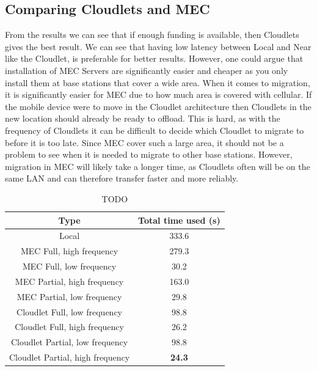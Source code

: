 
\subsection{Comparing Cloudlets and MEC}
From the results we can see that if enough funding is available, then Cloudlets gives the best result. We can see that having low latency between Local and Near like the Cloudlet, is preferable for better results. However, one could argue that installation of MEC Servers are significantly easier and cheaper as you only install them at base stations that cover a wide area. When it comes to migration, it is significantly easier for MEC due to how much area is covered with cellular. If the mobile device were to move in the Cloudlet architecture then Cloudlets in the new location should already be ready to offload. This is hard, as with the frequency of Cloudlets it can be difficult to decide which Cloudlet to migrate to before it is too late. Since MEC cover such a large area, it should not be a problem to see when it is needed to migrate to other base stations. However, migration in MEC will likely take a longer time, as Cloudlets often will be on the same LAN and can therefore transfer faster and more reliably.

\begin{table}[]
    \centering
    \begin{tabular}{|c|c|}
        \hline
       Type  & Total time used (s)\\
       \hline
       \hline
       Local                            & 333.6  \\
       \hline
       MEC Full, high frequency         & 279.3 \\
       \hline
       MEC Full, low frequency         & 30.2 \\
       \hline
       MEC Partial, high frequency      & 163.0 \\
       \hline
       MEC Partial, low frequency      & 29.8 \\
       \hline
       Cloudlet Full, low frequency    & 98.8 \\
       \hline
       Cloudlet Full, high frequency    & 26.2 \\
       \hline
       Cloudlet Partial, low frequency    & 98.8 \\
       \hline
       Cloudlet Partial, high frequency    & \textbf{24.3} \\
       \hline
    \end{tabular}
    \caption{TODO}
    \label{tab:total_time_compare}
\end{table}



